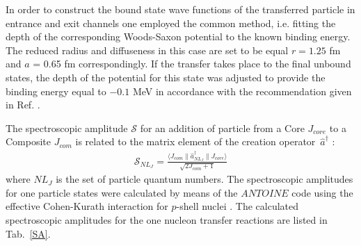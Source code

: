 \documentclass[10pt]{iopart}
\begin{document}
In order to construct the bound state wave functions of the transferred particle in entrance and exit channels one employed the common method, i.e. fitting the depth of the corresponding Woods-Saxon potential to the known binding energy. The reduced radius and diffuseness in this case are set to be equal $r = 1.25$ fm and $a$ = 0.65 fm correspondingly. If the transfer takes place to the final unbound states, the depth of the potential for this state was adjusted to provide the binding energy equal to $-0.1$ MeV in accordance with the recommendation given in Ref. \cite{harakeh1980}.


The spectroscopic amplitude  $\mathcal{S}$ for an addition of particle from a Core $J_{core}$ to a Composite $J_{com}$ is related to the matrix element of the creation operator~$\hat{a}^\dagger$ :
\begin{eqnarray}\label{eq:SA}
\mathcal{S}_{NL_J} = \frac{\langle J_{com} \| \hat{a}^\dagger _{NL_J} \| J_{core}  \rangle}{\sqrt{2J_{com}+1}} 
\end{eqnarray}
where $NL_J$ is the set of particle quantum numbers. The spectroscopic amplitudes for one particle states were calculated by means of the $ANTOINE$ code \cite{antoine}  using the effective Cohen-Kurath interaction for $p$-shell nuclei \cite{cohen1965}. The calculated spectroscopic amplitudes for the one nucleon transfer reactions are listed in Tab.~\ref{SA}.
\end{document}
